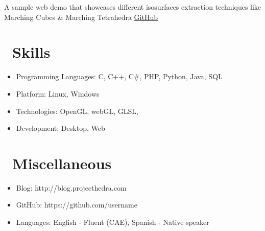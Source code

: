 \documentclass{resume}
\begin{document}
A sample web demo that showcases different isosurfaces extraction techniques like Marching Cubes \& Marching Tetrahedra
\href {https://github.com/maxilevi/isosurface}{GitHub}


\section{\faCogs\ Skills}
\begin{itemize}[parsep=0.5ex]
  \item Programming Languages: C, C++, C\#, PHP, Python, Java, SQL
  \item Platform: Linux, Windows
  \item Technologies: OpenGL, webGL, GLSL,
  \item Development: Desktop, Web
\end{itemize}

\section{\faInfo\ Miscellaneous}
\begin{itemize}[parsep=0.5ex]
  \item Blog: http://blog.projecthedra.com
  \item GitHub: https://github.com/username
  \item Languages: English - Fluent (CAE), Spanish - Native speaker
\end{itemize}
\end{document}
